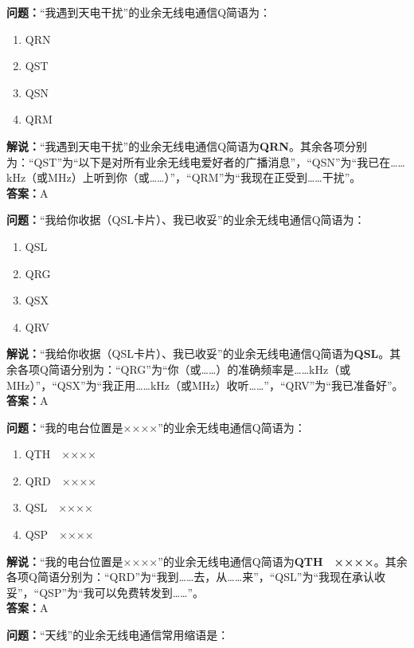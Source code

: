 \textbf{问题：}“我遇到天电干扰”的业余无线电通信Q简语为：

\begin{enumerate}[label=\Alph*), leftmargin=1cm]
	\item QRN
	\item QST
	\item QSN
	\item QRM
\end{enumerate}

\textbf{解说：}“我遇到天电干扰”的业余无线电通信Q简语为\textbf{QRN}。其余各项分别为：“QST”为“以下是对所有业余无线电爱好者的广播消息”，“QSN”为“我已在……kHz（或MHz）上听到你（或……）”，“QRM”为“我现在正受到……干扰”。\\\textbf{答案：}A



\textbf{问题：}“我给你收据（QSL卡片）、我已收妥”的业余无线电通信Q简语为：

\begin{enumerate}[label=\Alph*), leftmargin=1cm]
	\item QSL
	\item QRG
	\item QSX
	\item QRV
\end{enumerate}

\textbf{解说：}“我给你收据（QSL卡片）、我已收妥”的业余无线电通信Q简语为\textbf{QSL}。其余各项Q简语分别为：“QRG”为“你（或……）的准确频率是……kHz（或MHz）”，“QSX”为“我正用……kHz（或MHz）收听……”，“QRV”为“我已准备好”。\\\textbf{答案：}A



\textbf{问题：}“我的电台位置是××××”的业余无线电通信Q简语为：

\begin{enumerate}[label=\Alph*), leftmargin=1cm]
	\item QTH　××××
	\item QRD　××××
	\item QSL　××××
	\item QSP　××××
\end{enumerate}

\textbf{解说：}“我的电台位置是××××”的业余无线电通信Q简语为\textbf{QTH　××××}。其余各项Q简语分别为：“QRD”为“我到……去，从……来”，“QSL”为“我现在承认收妥”，“QSP”为“我可以免费转发到……”。\\\textbf{答案：}A



\textbf{问题：}“天线”的业余无线电通信常用缩语是：

